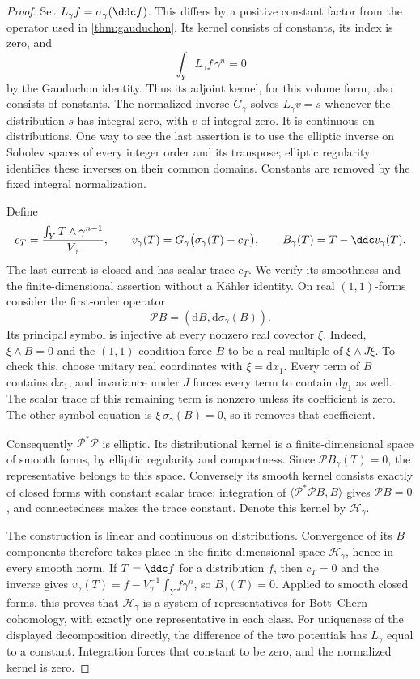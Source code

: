 \begin{proof}
Set $L_\gamma f=\sigma_\gamma(\ddc f)$. This differs by a positive constant factor from the operator used in \cref{thm:gauduchon}. Its kernel consists of constants, its index is zero, and
\[
 \int_Y L_\gamma f\,\gamma^n=0
\]
by the Gauduchon identity. Thus its adjoint kernel, for this volume form, also consists of constants. The normalized inverse $G_\gamma$ solves $L_\gamma v=s$ whenever the distribution $s$ has integral zero, with $v$ of integral zero. It is continuous on distributions. One way to see the last assertion is to use the elliptic inverse on Sobolev spaces of every integer order and its transpose; elliptic regularity identifies these inverses on their common domains. Constants are removed by the fixed integral normalization.

Define
\[
 c_T=\frac{\int_YT\wedge\gamma^{n-1}}{V_\gamma},\qquad
 v_\gamma(T)=G_\gamma\bigl(\sigma_\gamma(T)-c_T\bigr),\qquad
 B_\gamma(T)=T-\ddc v_\gamma(T).
\]
The last current is closed and has scalar trace $c_T$. We verify its smoothness and the finite-dimensional assertion without a K\"ahler identity. On real $(1,1)$-forms consider the first-order operator
\[
 \mathscr P B=(\mathrm{d}B,\mathrm{d}\sigma_\gamma(B)).
\]
Its principal symbol is injective at every nonzero real covector $\xi$. Indeed, $\xi\wedge B=0$ and the $(1,1)$ condition force $B$ to be a real multiple of $\xi\wedge J\xi$. To check this, choose unitary real coordinates with $\xi=\mathrm{d}x_1$. Every term of $B$ contains $\mathrm{d}x_1$, and invariance under $J$ forces every term to contain $\mathrm{d}y_1$ as well. The scalar trace of this remaining term is nonzero unless its coefficient is zero. The other symbol equation is $\xi\,\sigma_\gamma(B)=0$, so it removes that coefficient.

Consequently $\mathscr P^*\mathscr P$ is elliptic. Its distributional kernel is a finite-dimensional space of smooth forms, by elliptic regularity and compactness. Since $\mathscr P B_\gamma(T)=0$, the representative belongs to this space. Conversely its smooth kernel consists exactly of closed forms with constant scalar trace: integration of $\langle\mathscr P^*\mathscr P B,B\rangle$ gives $\mathscr P B=0$, and connectedness makes the trace constant. Denote this kernel by $\mathscr H_\gamma$.

The construction is linear and continuous on distributions. Convergence of its $B$ components therefore takes place in the finite-dimensional space $\mathscr H_\gamma$, hence in every smooth norm. If $T=\ddc f$ for a distribution $f$, then $c_T=0$ and the inverse gives $v_\gamma(T)=f-V_\gamma^{-1}\int_Yf\gamma^n$, so $B_\gamma(T)=0$. Applied to smooth closed forms, this proves that $\mathscr H_\gamma$ is a system of representatives for Bott--Chern cohomology, with exactly one representative in each class. For uniqueness of the displayed decomposition directly, the difference of the two potentials has $L_\gamma$ equal to a constant. Integration forces that constant to be zero, and the normalized kernel is zero.


\end{proof}
